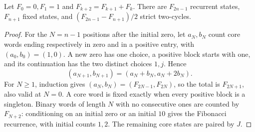 \begin{corollary}\label{cor:census}
Let $F_0=0,F_1=1$ and $F_{k+2}=F_{k+1}+F_k$. There are
$F_{2n-1}$ recurrent states, $F_{n+1}$ fixed states, and
$(F_{2n-1}-F_{n+1})/2$ strict two-cycles.
\end{corollary}
\begin{proof}
For the $N=n-1$ positions after the initial zero, let $a_N,b_N$ count
core words ending respectively in zero and in a positive entry, with
$(a_0,b_0)=(1,0)$. A new zero has one choice, a positive block starts
with one, and its continuation has the two distinct choices $1,j$.
Hence
\begin{equation}\label{eq:countrec}
 (a_{N+1},b_{N+1})=(a_N+b_N,a_N+2b_N).
\end{equation}
For $N\ge1$, induction gives $(a_N,b_N)=(F_{2N-1},F_{2N})$, so the
total is $F_{2N+1}$, also valid at $N=0$. A core word is fixed exactly
when every positive block is a singleton. Binary words of length $N$
with no consecutive ones are counted by $F_{N+2}$: conditioning on an
initial zero or an initial $10$ gives the Fibonacci recurrence, with
initial counts $1,2$. The remaining core states are paired by $J$.
\end{proof}
